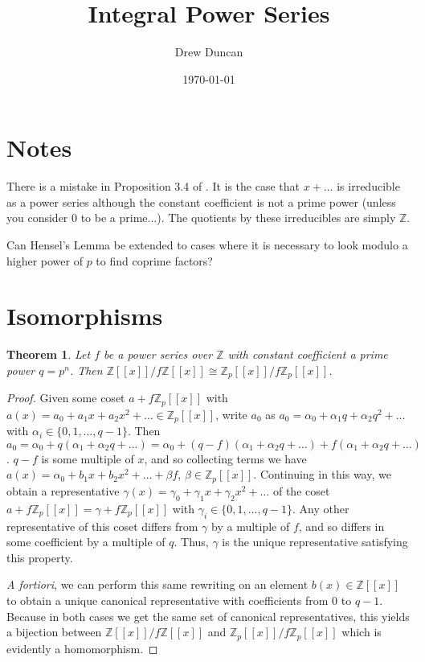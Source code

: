 \documentclass{article}
\title{Integral Power Series}
\author{Drew Duncan}
\date{\today}
\newtheorem{theorem}{Theorem}
\begin{document}
\maketitle

\section{Notes}
There is a mistake in Proposition 3.4 of \cite{integerpowerseries_MR2416254}.  It is the case that $x + \ldots$ is irreducible as a power series although the constant coefficient is not a prime power (unless you consider 0 to be a prime...).  The quotients by these irreducibles are simply $\mathbb{Z}$.


Can Hensel's Lemma be extended to cases where it is necessary to look modulo a higher power of $p$ to find coprime factors?

\section{Isomorphisms}
\begin{theorem} \label{iso1}
Let $f$ be a power series over $\mathbb{Z}$ with constant coefficient a prime power $q = p^n$.  Then $\mathbb{Z}[[x]]/f\mathbb{Z}[[x]] \cong \mathbb{Z}_p[[x]]/f\mathbb{Z}_p[[x]]$.
\end{theorem}
\begin{proof}
Given some coset $a + f\mathbb{Z}_p[[x]]$ with $a(x) = a_0 + a_1x + a_2x^2 + \ldots \in \mathbb{Z}_p[[x]]$, write $a_0$ as $a_0 = \alpha_0 + \alpha_1q + \alpha_2q^2 + \ldots$ with $\alpha_i \in \{0,1,\ldots,q-1\}$.  Then $a_0 = \alpha_0 + q(\alpha_1 + \alpha_2q + \ldots) = \alpha_0 + (q-f)(\alpha_1 + \alpha_2q + \ldots) + f(\alpha_1 + \alpha_2q + \ldots)$.  $q-f$ is some multiple of $x$, and so collecting terms we have $a(x) = \alpha_0 + b_1x + b_2x^2 + \ldots + \beta f$, $\beta \in \mathbb{Z}_p[[x]]$.  Continuing in this way, we obtain a representative $\gamma(x) = \gamma_0 + \gamma_1x + \gamma_2x^2 + \ldots$ of the coset $a + f\mathbb{Z}_p[[x]] = \gamma + f\mathbb{Z}_p[[x]]$ with $\gamma_i \in \{0,1,\ldots,q-1\}$.  Any other representative of this coset differs from $\gamma$ by a multiple of $f$, and so differs in some coefficient by a multiple of $q$.  Thus, $\gamma$ is the unique representative satisfying this property.

\textit{A fortiori}, we can perform this same rewriting on an element $b(x) \in \mathbb{Z}[[x]]$ to obtain a unique canonical representative with coefficients from $0$ to $q-1$.  Because in both cases we get the same set of canonical representatives, this yields a bijection between $\mathbb{Z}[[x]]/f\mathbb{Z}[[x]]$ and $\mathbb{Z}_p[[x]]/f\mathbb{Z}_p[[x]]$ which is evidently a homomorphism.
\end{proof}
\end{document}

